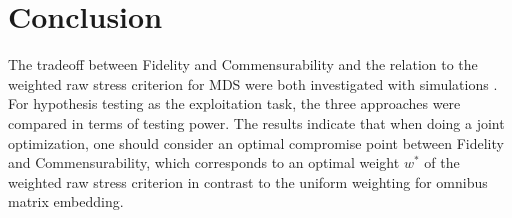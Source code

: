 \documentclass[12pt]{article} %
\begin{document}

\section{Conclusion}
 The tradeoff between Fidelity and Commensurability and the relation to the weighted raw stress criterion for MDS were both investigated with simulations .
   For  hypothesis testing as the exploitation task, the three approaches were compared in terms of testing power.
    The results indicate that when doing a joint optimization, one should consider an optimal compromise point between Fidelity and Commensurability,
       which corresponds to an optimal weight $w^*$ of the weighted raw stress criterion in contrast to the uniform weighting 
        for omnibus matrix embedding. 
        




\end{document}
